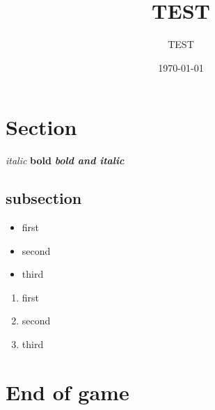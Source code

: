 \documentclass{article}%
\title{TEST}%
\author{TEST}%
\date{\today}%
\begin{document}
%
\pagestyle{empty}%
\normalsize%
\maketitle%
\section{ Section
}%
\label{sec:Section}%
\textit{italic}%
\textit{ }%
\textbf{bold}%
\textit{ }%
\textbf{\textit{bold and italic}}%



%
\subsection{ subsection
}%
\label{subsec:subsection}%
\begin{itemize}%
\item%
%
 first
%
\item%
%
 second
%
\item%
%
 third
%
\end{itemize}%
\begin{enumerate}%
\item%
%
 first
%
\item%
%
 second
%
\item%
%
 third
%
\end{enumerate}

%
\section{ End of game}%
\label{sec:Endofgame}%

%
\end{document}
